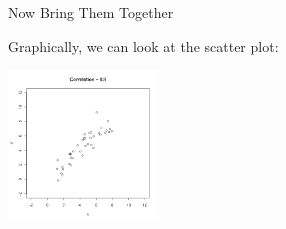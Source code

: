 \begin{frame}
\begin{columns}
{    }


  \end{columns}


\end{frame}



\begin{frame}{Now Bring Them Together}

  Graphically, we can look at the scatter plot:

  \includegraphics[height=4cm]{img/correlation09}
  
\end{frame}



